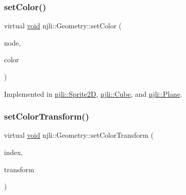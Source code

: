 \mbox{\label{classnjli_1_1_geometry_a6ba967a65603a7660ab63fe067e338b4}} 
\subsubsection{\texorpdfstring{set\+Color()}{setColor()}}
{\footnotesize\ttfamily virtual \mbox{\hyperlink{_thread_8h_af1e856da2e658414cb2456cb6f7ebc66}{void}} njli\+::\+Geometry\+::set\+Color (\begin{DoxyParamCaption}\item[{\mbox{\hyperlink{classnjli_1_1_node}{Node}} $\ast$}]{node,  }\item[{const bt\+Vector4 \&}]{color }\end{DoxyParamCaption})\hspace{0.3cm}{\ttfamily [pure virtual]}}



Implemented in \mbox{\hyperlink{classnjli_1_1_sprite2_d_a5b32ecafaa923c27662db4ae37286815}{njli\+::\+Sprite2D}}, \mbox{\hyperlink{classnjli_1_1_cube_aa07b851ff55bd189771d467ca94be5fa}{njli\+::\+Cube}}, and \mbox{\hyperlink{classnjli_1_1_plane_a60396b5d7d0d1984cb05703a843cce79}{njli\+::\+Plane}}.

\mbox{\label{classnjli_1_1_geometry_aa0cc2acc76701fd62efdcddd802e4cda}} 
\subsubsection{\texorpdfstring{set\+Color\+Transform()}{setColorTransform()}}
{\footnotesize\ttfamily virtual \mbox{\hyperlink{_thread_8h_af1e856da2e658414cb2456cb6f7ebc66}{void}} njli\+::\+Geometry\+::set\+Color\+Transform (\begin{DoxyParamCaption}\item[{const \mbox{\hyperlink{_util_8h_ad758b7a5c3f18ed79d2fcd23d9f16357}{u64}}}]{index,  }\item[{const bt\+Transform \&}]{transform }\end{DoxyParamCaption})\hspace{0.3cm}{\ttfamily [virtual]}}

